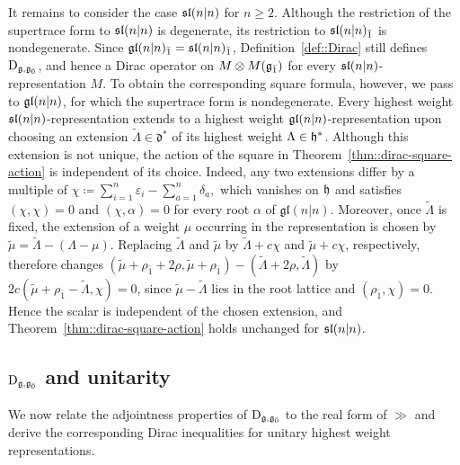 It remains to consider the case $\sl(n\vert n)$ for $n\geq 2$. Although the restriction of the supertrace form to $\sl(n\vert n)$ is degenerate, its restriction to $\sl(n\vert n)_{\bar{1}}$ is nondegenerate. Since $\gl(n\vert n)_{\bar{1}}=\sl(n\vert n)_{\bar{1}}$, Definition~\ref{def::Dirac} still defines $\Dirac_{\gg,\even}$, and hence a Dirac operator on $M\otimes M(\odd)$ for every $\sl(n\vert n)$-representation $M$. To obtain the corresponding square formula, however, we pass to $\gl(n\vert n)$, for which the supertrace form is nondegenerate. Every highest weight $\sl(n\vert n)$-representation extends to a highest weight $\gl(n\vert n)$-representation upon choosing an extension $\widetilde{\Lambda}\in\mathfrak{d}^{\ast}$ of its highest weight $\Lambda\in\hh^{\ast}$. Although this extension is not unique, the action of the square in Theorem~\ref{thm::dirac-square-action} is independent of its choice. Indeed, any two extensions differ by a multiple of
$
 \chi\coloneqq\sum_{i=1}^{n}\varepsilon_i-\sum_{a=1}^{n}\delta_a,
$
which vanishes on $\hh$ and satisfies $(\chi,\chi)=0$ and $(\chi,\alpha)=0$ for every root $\alpha$ of $\mathfrak{gl}(n\vert n)$. Moreover, once $\widetilde\Lambda$ is fixed, the extension of a weight $\mu$ occurring in the representation is chosen by
$\widetilde{\mu}=\widetilde{\Lambda}-(\Lambda-\mu)$. Replacing $\widetilde{\Lambda}$ and $\widetilde{\mu}$ by $\widetilde{\Lambda}+c\chi$ and $\widetilde{\mu}+c\chi$, respectively, therefore changes
$
 (\widetilde{\mu}+\rho_{\bar{1}}+2\rho,\widetilde{\mu}+\rho_{\bar{1}})
 -
 (\widetilde{\Lambda}+2\rho,\widetilde{\Lambda})
$
by $2c(\widetilde{\mu}+\rho_{\bar{1}}-\widetilde{\Lambda},\chi)=0$, since $\widetilde{\mu}-\widetilde{\Lambda}$ lies in the root lattice and $(\rho_{\bar{1}},\chi)=0$. Hence the scalar is independent of the chosen extension, and Theorem~\ref{thm::dirac-square-action} holds unchanged for $\sl(n\vert n)$. 








\subsection{\texorpdfstring{$\Dirac_{\gg,\even}$}{} and unitarity}
\label{subsec::Dirac_and_unitarity}

We now relate the adjointness properties of $\Dirac_{\gg,\even}$ to the
real form of $\gg$ and derive the corresponding Dirac inequalities for
unitary highest weight representations.

